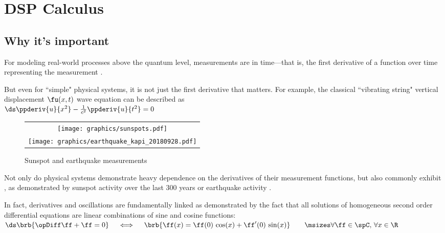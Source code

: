 \chapter{DSP Calculus}

\section{Why it's important}
For modeling real-world processes above the quantum level, measurements are  in time---that is,
the first derivative of a function over time representing the measurement .

But even for ``simple" physical systems, it is not just the first derivative that matters.
For example, the classical ``vibrating string" vertical displacement $\fu(x,t)$ wave equation can be described as
        \\\indentx$\ds\ppderiv{u}{x^2} - \frac{1}{c^2}\ppderiv{u}{t^2} = 0$

\begin{figure}
  \centering
  \begin{tabular}{c}
    \texttt{[image: graphics/sunspots.pdf]}\\
    \texttt{[image: graphics/earthquake\_kapi\_20180928.pdf]}
  \end{tabular}
  \caption{Sunspot and earthquake measurements\label{fig:sunspot}}
\end{figure}
Not only do physical systems demonstrate heavy dependence on the derivatives of their measurement functions,
but also commonly exhibit , as demonstrated by sunspot activity over the last 300 years or
earthquake activity .

In fact, derivatives and oscillations are fundamentally linked
as demonstrated by the fact that 
all solutions of homogeneous second order differential equations
        are linear combinations of sine and cosine functions:
        \\\indentx$\ds  \brb{\opDiff\ff + \ff=0}
  \quad\iff\quad
  \brb{\ff(x) = \ff(0)\,\cos(x) + \ff^\prime(0)\,\sin(x)}
  \qquad\msizes\forall\ff\in\spC,\,\forall x\in\R$

